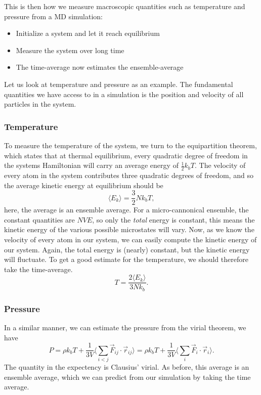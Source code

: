 \documentclass[a4paper, 11pt, notitlepage, english]{article}
\renewcommand{\b}{\bigg}
\begin{document}
This is then how we measure macroscopic quantities such as temperature and pressure from a MD simulation:
\begin{itemize}
	\item Initialize a system and let it reach equilibrium
	\item Measure the system over long time
	\item The time-average now estimates the ensemble-average
\end{itemize}
Let us look at temperature and pressure as an example. The fundamental quantities we have access to in a simulation is the position and velocity of all particles in the system.

\subsubsection*{Temperature}
To measure the temperature of the system, we turn to the equipartition theorem, which states that at thermal equilibrium, every quadratic degree of freedom in the systems Hamiltonian will carry an average energy of $\frac{1}{2}k_b T$. The velocity of every atom in the system contributes three quadratic degrees of freedom, and so the average kinetic energy at equilibrium should be
$$\langle E_k \rangle = \frac{3}{2}N k_b T,$$
here, the average is an ensemble average. For a micro-cannonical ensemble, the constant quantities are $NVE$, so only the \emph{total} energy is constant, this means the kinetic energy of the various possible microstates will vary. Now, as we know the velocity of every atom in our system, we can easily compute the kinetic energy of our system. Again, the total energy is (nearly) constant, but the kinetic energy will fluctuate. To get a good estimate for the temperature, we should therefore take the time-average.
$$T = \frac{2\langle E_k \rangle}{3Nk_b}.$$

\subsubsection*{Pressure}

In a similar manner, we can estimate the pressure from the virial theorem, we have
$$P = \rho k_b T + \frac{1}{3V}\bigg\langle \sum_{i<j}\vec{F}_{ij} \cdot \vec{r}_{ij} \b\rangle= \rho k_b T + \frac{1}{3V}\b\langle\sum_{i}\vec{F}_{i} \cdot \vec{r}_{i}\b\rangle.$$
The quantity in the expectency is Clausius' virial. As before, this average is an ensemble average, which we can predict from our simulation by taking the time average.
\end{document}
